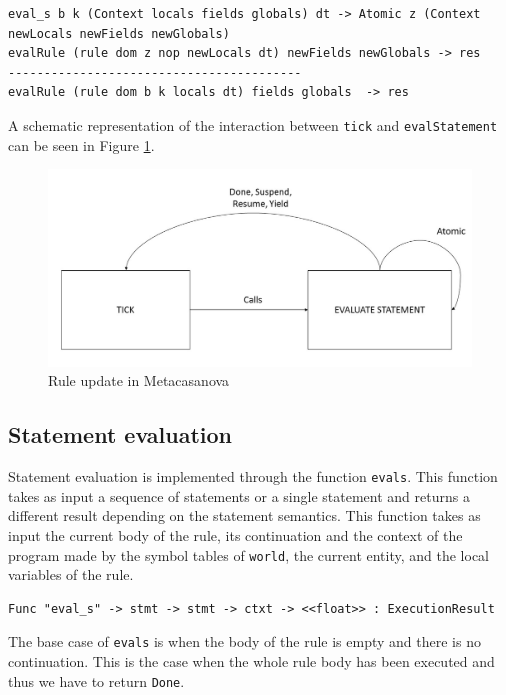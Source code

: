 \begin{lstlisting}
eval_s b k (Context locals fields globals) dt -> Atomic z (Context newLocals newFields newGlobals)
evalRule (rule dom z nop newLocals dt) newFields newGlobals -> res
-----------------------------------------
evalRule (rule dom b k locals dt) fields globals  -> res
\end{lstlisting}

A schematic representation of the interaction between \texttt{tick} and \texttt{evalStatement} can be seen in Figure \ref{fig:ch_mcnv_languages_rule_update}.

\begin{figure}
	\centering
	\includegraphics[width=\textwidth]{Figures/statement_evaluation}
	\caption{Rule update in Metacasanova}
	\label{fig:ch_mcnv_languages_rule_update}
\end{figure}

\subsection{Statement evaluation}
Statement evaluation is implemented through the function \texttt{eval\tu s}. This function takes as input a sequence of statements or a single statement and returns a different result depending on the statement semantics. This function takes as input the current body of the rule, its continuation and the context of the program made by the symbol tables of \texttt{world}, the current entity, and the local variables of the rule.

\begin{lstlisting}
Func "eval_s" -> stmt -> stmt -> ctxt -> <<float>> : ExecutionResult
\end{lstlisting}

\noindent
The base case of \texttt{eval\tu s} is when the body of the rule is empty and there is no continuation. This is the case when the whole rule body has been executed and thus we have to return \texttt{Done}.

